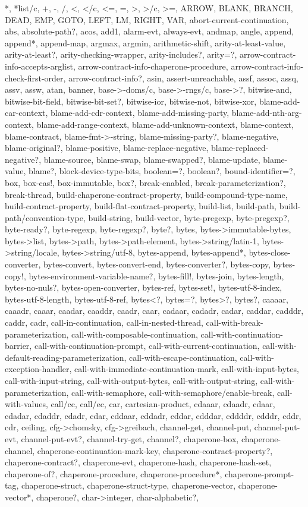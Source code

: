 {{			*, *list/c, +, -, /, <, </c, <=, =, >, >/c, >=, ARROW, BLANK, BRANCH, DEAD, EMP, GOTO, LEFT, LM, RIGHT, VAR, abort-current-continuation, abs, absolute-path?, acos, add1, alarm-evt, always-evt, andmap, angle, append, append*, append-map, argmax, argmin, arithmetic-shift, arity-at-least-value, arity-at-least?, arity-checking-wrapper, arity-includes?, arity=?, arrow-contract-info-accepts-arglist, arrow-contract-info-chaperone-procedure, arrow-contract-info-check-first-order, arrow-contract-info?, asin, assert-unreachable, assf, assoc, assq, assv, assw, atan, banner, base->-doms/c, base->-rngs/c, base->?, bitwise-and, bitwise-bit-field, bitwise-bit-set?, bitwise-ior, bitwise-not, bitwise-xor, blame-add-car-context, blame-add-cdr-context, blame-add-missing-party, blame-add-nth-arg-context, blame-add-range-context, blame-add-unknown-context, blame-context, blame-contract, blame-fmt->-string, blame-missing-party?, blame-negative, blame-original?, blame-positive, blame-replace-negative, blame-replaced-negative?, blame-source, blame-swap, blame-swapped?, blame-update, blame-value, blame?, block-device-type-bits, boolean=?, boolean?, bound-identifier=?, box, box-cas!, box-immutable, box?, break-enabled, break-parameterization?, break-thread, build-chaperone-contract-property, build-compound-type-name, build-contract-property, build-flat-contract-property, build-list, build-path, build-path/convention-type, build-string, build-vector, byte-pregexp, byte-pregexp?, byte-ready?, byte-regexp, byte-regexp?, byte?, bytes, bytes->immutable-bytes, bytes->list, bytes->path, bytes->path-element, bytes->string/latin-1, bytes->string/locale, bytes->string/utf-8, bytes-append, bytes-append*, bytes-close-converter, bytes-convert, bytes-convert-end, bytes-converter?, bytes-copy, bytes-copy!, bytes-environment-variable-name?, bytes-fill!, bytes-join, bytes-length, bytes-no-nuls?, bytes-open-converter, bytes-ref, bytes-set!, bytes-utf-8-index, bytes-utf-8-length, bytes-utf-8-ref, bytes<?, bytes=?, bytes>?, bytes?, caaaar, caaadr, caaar, caadar, caaddr, caadr, caar, cadaar, cadadr, cadar, caddar, cadddr, caddr, cadr, call-in-continuation, call-in-nested-thread, call-with-break-parameterization, call-with-composable-continuation, call-with-continuation-barrier, call-with-continuation-prompt, call-with-current-continuation, call-with-default-reading-parameterization, call-with-escape-continuation, call-with-exception-handler, call-with-immediate-continuation-mark, call-with-input-bytes, call-with-input-string, call-with-output-bytes, call-with-output-string, call-with-parameterization, call-with-semaphore, call-with-semaphore/enable-break, call-with-values, call/cc, call/ec, car, cartesian-product, cdaaar, cdaadr, cdaar, cdadar, cdaddr, cdadr, cdar, cddaar, cddadr, cddar, cdddar, cddddr, cdddr, cddr, cdr, ceiling, cfg->chomsky, cfg->greibach, channel-get, channel-put, channel-put-evt, channel-put-evt?, channel-try-get, channel?, chaperone-box, chaperone-channel, chaperone-continuation-mark-key, chaperone-contract-property?, chaperone-contract?, chaperone-evt, chaperone-hash, chaperone-hash-set, chaperone-of?, chaperone-procedure, chaperone-procedure*, chaperone-prompt-tag, chaperone-struct, chaperone-struct-type, chaperone-vector, chaperone-vector*, chaperone?, char->integer, char-alphabetic?, }}
